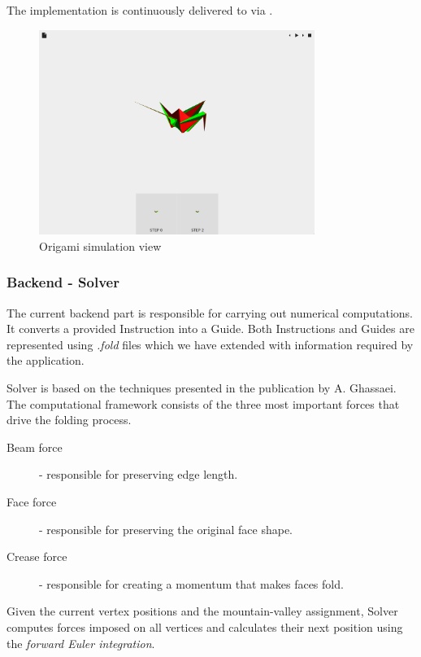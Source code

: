The implementation is continuously delivered to  via .


\begin{figure}[H]
\caption{Origami simulation view}
  \centering
    \includegraphics[width=0.8\textwidth]{assets/prototype-front.png}
\end{figure}

\subsubsection{Backend - Solver}

The current backend part is responsible for carrying out numerical computations.
It converts a provided Instruction into a Guide.
Both Instructions and Guides are represented using \textit{.fold} files which we have extended with information required by the application.
\smallskip

Solver is based on the techniques presented in the publication by A. Ghassaei\cite{origami-simulator:paper}.
The computational framework consists of the three most important forces that drive the folding process.

\begin{description}
	\item[Beam force] - responsible for preserving edge length.
	\item[Face force] - responsible for preserving the original face shape.
	\item[Crease force] - responsible for creating a momentum that makes faces fold.
\end{description}

Given the current vertex positions and the mountain-valley assignment,
Solver computes forces imposed on all vertices and calculates their next position
using the \textit{forward Euler integration}.

